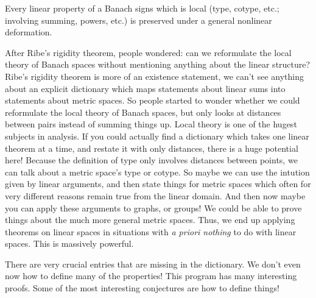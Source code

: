 Every linear property of a Banach signs which is local (type, cotype, etc.; involving summing, powers, etc.) is preserved under a general nonlinear deformation.

After Ribe's rigidity theorem, people wondered: can we reformulate the local theory of Banach spaces without mentioning anything about the linear structure? 
Ribe's rigidity theorem is more of an existence statement, we can't see anything about an explicit dictionary which maps statements about linear sums into statements about metric spaces. So people started to wonder whether we could reformulate the local theory of Banach spaces, but only looks at distances between pairs instead of summing things up. Local theory is one of the hugest subjects in analysis. If you could actually find a dictionary which takes one linear theorem at a time, and restate it with only distances, there is a huge potential here! Because the definition of type only involves distances between points, we can talk about a metric space's type or cotype. So maybe we can use the intution given by linear arguments, and then state things for metric spaces which often for very different reasons remain true from the linear domain. And then now maybe you can apply these arguments to graphs, or groups! We could be able to prove things about the much more general metric spaces. Thus, we end up applying theorems on linear spaces in situations with \emph{a priori nothing} to do with linear spaces. This is massively powerful.



There are very crucial entries that are missing in the dictionary. We don't even now how to define many of the properties! %
This program has many interesting proofs. Some of the most interesting conjectures are how to define things!

